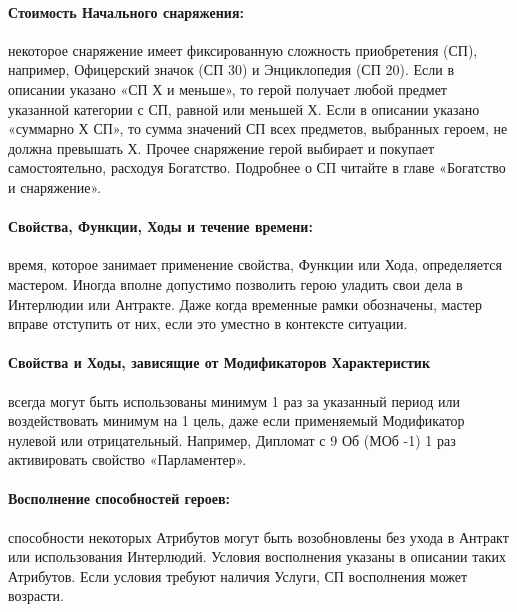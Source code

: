 \paragraph{Стоимость Начального снаряжения:} некоторое снаряжение имеет фиксированную сложность приобретения (СП), например, Офицерский значок (СП 30) и Энциклопедия (СП 20). Если в описании указано «СП Х и меньше», то герой получает любой предмет указанной категории с СП, равной или меньшей Х. Если в описании указано «суммарно Х СП», то сумма значений СП всех предметов, выбранных героем, не должна превышать Х. Прочее снаряжение герой выбирает и покупает самостоятельно, расходуя Богатство.
\newline Подробнее о СП читайте в главе «Богатство и снаряжение».
\paragraph{Свойства, Функции, Ходы и течение времени:} время, которое занимает применение свойства, Функции или Хода, определяется мастером. Иногда вполне допустимо позволить герою уладить свои дела в Интерлюдии или Антракте. Даже когда временные рамки обозначены, мастер вправе отступить от них, если это уместно в контексте ситуации.
\paragraph{Свойства и Ходы, зависящие от Модификаторов Характеристик} всегда могут быть использованы минимум 1 раз за указанный период или воздействовать минимум на 1 цель, даже если применяемый Модификатор нулевой или отрицательный. Например, Дипломат с 9 Об (МОб -1) 1 раз активировать свойство «Парламентер».
\paragraph{Восполнение способностей героев:} способности некоторых Атрибутов могут быть возобновлены без ухода в Антракт или использования Интерлюдий. Условия восполнения указаны в описании таких Атрибутов. Если условия требуют наличия Услуги, СП восполнения может возрасти.
